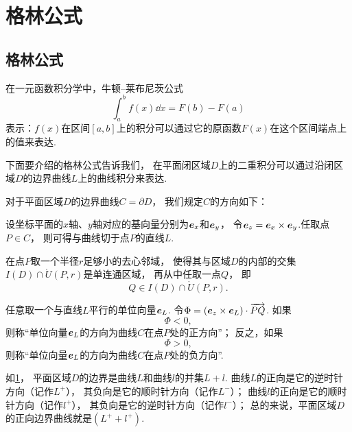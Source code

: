\section{格林公式}
\subsection{格林公式}
在一元函数积分学中，牛顿--莱布尼茨公式\[
	\int_a^b f(x) \dd{x} = F(b) - F(a)
\]表示：\(f(x)\)在区间\([a,b]\)上的积分可以通过它的原函数\(F(x)\)在这个区间端点上的值来表达.

下面要介绍的格林公式告诉我们，
在平面闭区域\(D\)上的二重积分可以通过沿闭区域\(D\)的边界曲线\(L\)上的曲线积分来表达.

\begin{definition}\label{definition:线积分与面积分.平面闭区域的边界曲线的取向}
对于平面区域\(D\)的边界曲线\(C = \partial D\)，
我们规定\(C\)的方向如下：

设坐标平面的\(x\)轴、\(y\)轴对应的基向量分别为\(\boldsymbol{e}_x\)和\(\boldsymbol{e}_y\)，
令\(\boldsymbol{e}_z = \boldsymbol{e}_x \times \boldsymbol{e}_y\).任取点\(P \in C\)，
则可得与曲线切于点\(P\)的直线\(L\).

在点\(P\)取一个半径\(r\)足够小的去心邻域，
使得其与区域\(D\)的内部的交集\(I(D) \cap \mathring{U}(P,r)\)是单连通区域，
再从中任取一点\(Q\)，
即\[
	Q \in I(D) \cap \mathring{U}(P,r).
\]

任意取一个与直线\(L\)平行的单位向量\(\boldsymbol{e}_L\).
令\(\Phi = (\boldsymbol{e}_z \times \boldsymbol{e}_L) \cdot \overrightarrow{PQ}\).
如果\[
\Phi < 0,
\]
则称“单位向量\(\boldsymbol{e}_L\)的方向为曲线\(C\)在点\(P\)处的正方向”；
反之，如果\[
	\Phi > 0,
\]
则称“单位向量\(\boldsymbol{e}_L\)的方向为曲线\(C\)在点\(P\)处的负方向”.
\end{definition}
如\cref{figure:线积分与面积分.平面区域的边界曲线与其取向}，
平面区域\(D\)的边界是曲线\(L\)和曲线\(l\)的并集\(L+l\).
曲线\(L\)的正向是它的逆时针方向（记作\(L^+\)），
其负向是它的顺时针方向（记作\(L^-\)）；
曲线\(l\)的正向是它的顺时针方向（记作\(l^+\)），
其负向是它的逆时针方向（记作\(l^-\)）；
总的来说，平面区域\(D\)的正向边界曲线就是\((L^+ + l^+)\).

\begin{figure}[ht]
\centering
{}
\caption{}
\label{figure:线积分与面积分.平面区域的边界曲线与其取向}
\end{figure}

